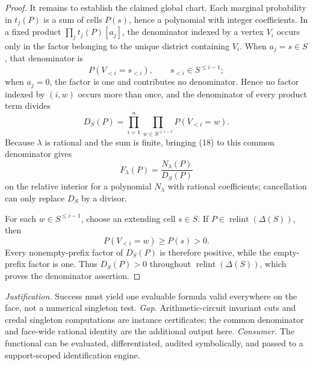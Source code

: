 \documentclass{article}
\begin{document}
\begin{proof}
It remains to establish the claimed global chart.  Each marginal probability in \(t_j(P)\) is a sum of cells \(P(s)\), hence a polynomial with integer coefficients.  In a fixed product \(\prod_jt_j(P)[a_j]\), the denominator indexed by a vertex \(V_i\) occurs only in the factor belonging to the unique district containing \(V_i\).  When \(a_j=s\in S\), that denominator is
\[
P(V_{<i}=s_{<i}),
\qquad s_{<i}\in S^{\le i-1};
\]
when \(a_j=0\), the factor is one and contributes no denominator.  Hence no factor indexed by \((i,w)\) occurs more than once, and the denominator of every product term divides
\[
D_S(P)=\prod_{i=1}^n\prod_{w\in S^{\le i-1}}P(V_{<i}=w).
\]
Because \(\lambda\) is rational and the sum is finite, bringing (18) to this common denominator gives
\[
F_\lambda(P)=\frac{N_\lambda(P)}{D_S(P)}                     \tag{19}
\]
on the relative interior for a polynomial \(N_\lambda\) with rational coefficients; cancellation can only replace \(D_S\) by a divisor.

For each \(w\in S^{\le i-1}\), choose an extending cell \(s\in S\).  If \(P\in\operatorname{relint}(\Delta(S))\), then
\[
P(V_{<i}=w)\ge P(s)>0.                                       \tag{20}
\]
Every nonempty-prefix factor of \(D_S(P)\) is therefore positive, while the empty-prefix factor is one.  Thus \(D_S(P)>0\) throughout \(\operatorname{relint}(\Delta(S))\), which proves the denominator assertion.
\end{proof}
\par\smallskip\noindent \textit{Justification.} Success must yield one evaluable formula valid everywhere on the face, not a numerical singleton test. \textit{Gap.} Arithmetic-circuit invariant cuts and credal singleton computations are instance certificates; the common denominator and face-wide rational identity are the additional output here. \textit{Consumer.} The functional can be evaluated, differentiated, audited symbolically, and passed to a support-scoped identification engine.
\end{document}
